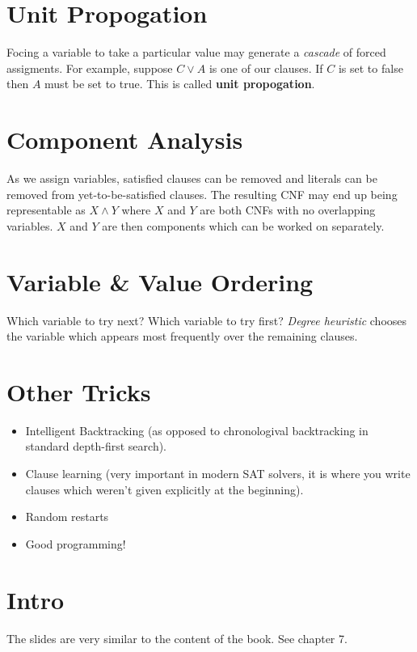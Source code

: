 \documentclass[11pt]{article}
\begin{document}
\section{Unit Propogation}
\label{sec:org17e6f87}
Focing a variable to take a particular value may generate a \emph{cascade} of forced assigments.
For example, suppose \(C \lor A\) is one of our clauses.
If \(C\) is set to false then \(A\) must be set to true.
This is called \textbf{unit propogation}.

\section{Component Analysis}
\label{sec:org55b2faa}
As we assign variables, satisfied clauses can be removed and literals can be removed from yet-to-be-satisfied clauses.
The resulting CNF may end up being representable as \(X \land Y\) where \(X\) and \(Y\) are both CNFs with no overlapping variables.
\(X\) and \(Y\) are then components which can be worked on separately.

\section{Variable \& Value Ordering}
\label{sec:orgc13fba5}
Which variable to try next? Which variable to try first?
\emph{Degree heuristic} chooses the variable which appears most frequently over the remaining clauses.

\section{Other Tricks}
\label{sec:orgcf59b2b}
\begin{itemize}
\item Intelligent Backtracking (as opposed to chronologival backtracking in standard depth-first search).
\item Clause learning (very important in modern SAT solvers, it is where you write clauses which weren't given explicitly at the beginning).
\item Random restarts
\item Good programming!
\end{itemize}

\maketitle
\tableofcontents


\section{Intro}
\label{sec:org8ac8ab8}
The slides are very similar to the content of the book.
See chapter 7.
\end{document}
